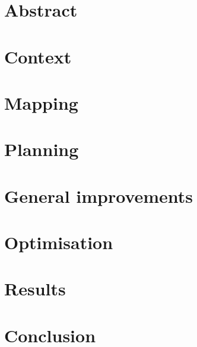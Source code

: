 \documentclass{report}
\begin{document}


\chapter*{Abstract}


\tableofcontents

\chapter{Context}


\chapter{Mapping}


\chapter{Planning}


\chapter{General improvements}


\chapter{Optimisation}


\chapter{Results}


\chapter*{Conclusion}


\listofalgorithms
{}
\end{document}
